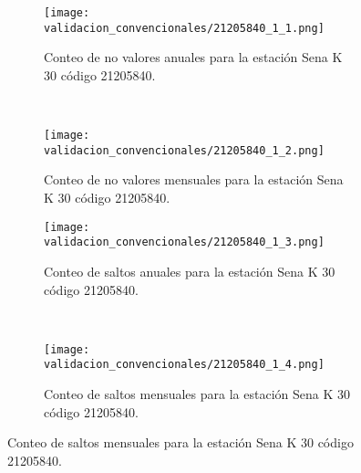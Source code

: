 \begin{figure}[H]\ContinuedFloat
\centering
	\begin{subfigure}[normla]{0.4\textwidth}
	\texttt{[image: validacion\_convencionales/21205840\_1\_1.png]}
		\caption{Conteo de no valores anuales para la estación Sena K 30 código 21205840.}
		\label{subfig:a1}
		\end{subfigure}
		~
    \begin{subfigure}[normla]{0.4\textwidth}
	\texttt{[image: validacion\_convencionales/21205840\_1\_2.png]}
		\caption{Conteo de no valores mensuales para la estación Sena K 30 código 21205840.}
		\label{subfig:a2}
		\end{subfigure}
		
    \begin{subfigure}[normla]{0.4\textwidth}
	\texttt{[image: validacion\_convencionales/21205840\_1\_3.png]}
		\caption{Conteo de saltos anuales para la estación Sena K 30 código 21205840.}
		\label{subfig:a1}
		\end{subfigure}
		~
    \begin{subfigure}[normla]{0.4\textwidth}
	\texttt{[image: validacion\_convencionales/21205840\_1\_4.png]}
		\caption{Conteo de saltos mensuales para la estación Sena K 30 código 21205840.}
		\label{subfig:a2}
		\end{subfigure}

	
\end{figure}
           
\begin{figure}[H]\ContinuedFloat
\centering
\end{figure}
           
